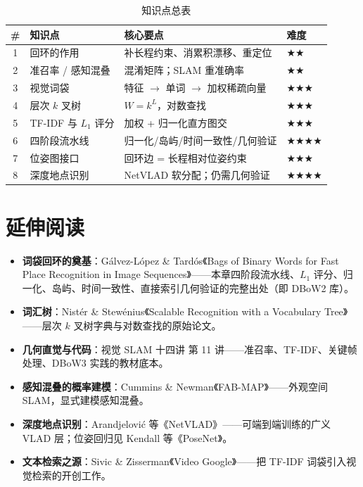 \begin{table}[H]\centering\small
\caption{知识点总表}
\begin{tabular}{clll}
\toprule
\# & 知识点 & 核心要点 & 难度 \\
\midrule
1 & 回环的作用 & 补长程约束、消累积漂移、重定位 & $\bigstar\bigstar$ \\
2 & 准召率 / 感知混叠 & 混淆矩阵；SLAM 重准确率 & $\bigstar\bigstar$ \\
3 & 视觉词袋 & 特征 $\to$ 单词 $\to$ 加权稀疏向量 & $\bigstar\bigstar\bigstar$ \\
4 & 层次 $k$ 叉树 & $W=k^L$，对数查找 & $\bigstar\bigstar\bigstar$ \\
5 & TF-IDF 与 $L_1$ 评分 & 加权 + 归一化直方图交 & $\bigstar\bigstar\bigstar$ \\
6 & 四阶段流水线 & 归一化/岛屿/时间一致性/几何验证 & $\bigstar\bigstar\bigstar\bigstar$ \\
7 & 位姿图接口 & 回环边 = 长程相对位姿约束 & $\bigstar\bigstar\bigstar$ \\
8 & 深度地点识别 & NetVLAD 软分配；仍需几何验证 & $\bigstar\bigstar\bigstar\bigstar$ \\
\bottomrule
\end{tabular}
\end{table}

\section*{延伸阅读}
\begin{itemize}
  \item \textbf{词袋回环的奠基}：Gálvez-López \& Tardós《Bags of Binary Words for Fast Place Recognition in Image Sequences》\cite{galvez2012bags}——本章四阶段流水线、$L_1$ 评分、归一化、岛屿、时间一致性、直接索引几何验证的完整出处（即 DBoW2 库）。
  \item \textbf{词汇树}：Nistér \& Stewénius《Scalable Recognition with a Vocabulary Tree》\cite{nister2006scalable}——层次 $k$ 叉树字典与对数查找的原始论文。
  \item \textbf{几何直觉与代码}：视觉 SLAM 十四讲\cite{gaoxiang2019slam14} 第 11 讲——准召率、TF-IDF、关键帧处理、DBoW3 实践的教材底本。
  \item \textbf{感知混叠的概率建模}：Cummins \& Newman《FAB-MAP》\cite{cummins2008fabmap}——外观空间 SLAM，显式建模感知混叠。
  \item \textbf{深度地点识别}：Arandjelović 等《NetVLAD》\cite{arandjelovic2016netvlad}——可端到端训练的广义 VLAD 层；位姿回归见 Kendall 等《PoseNet》\cite{kendall2015posenet}。
  \item \textbf{文本检索之源}：Sivic \& Zisserman《Video Google》\cite{sivic2003video}——把 TF-IDF 词袋引入视觉检索的开创工作。
\end{itemize}

